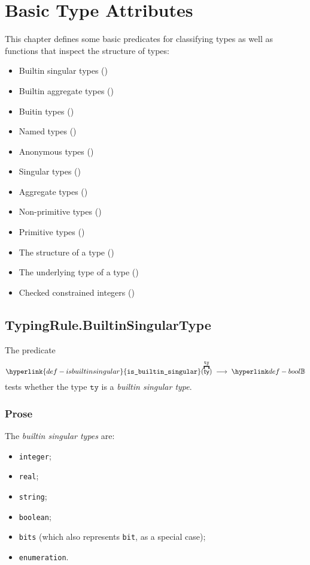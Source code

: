 \documentclass{book}
\newcommand\isbuiltinsingular[0]{\hyperlink{def-isbuiltinsingular}{\texttt{is\_builtin\_singular}}}
\newcommand\tty[0]{\texttt{ty}}
\begin{document}
\chapter{Basic Type Attributes}

This chapter defines some basic predicates for classifying types as well as
functions that inspect the structure of types:
\begin{itemize}
  \item Builtin singular types ()
  \item Builtin aggregate types ()
  \item Buitin types ()
  \item Named types ()
  \item Anonymous types ()
  \item Singular types ()
  \item Aggregate types ()
  \item Non-primitive types ()
  \item Primitive types ()
  \item The structure of a type ()
  \item The underlying type of a type ()
  \item Checked constrained integers ()
\end{itemize}

\section{TypingRule.BuiltinSingularType \label{sec:TypingRule.BuiltinSingularType}}
\hypertarget{def-isbuiltinsingular}{}
The predicate
\[
  \isbuiltinsingular(\overname{\ty}{\tty}) \;\aslto\; \Bool
\]
tests whether the type $\tty$ is a \emph{builtin singular type}.

\subsection{Prose}
The \emph{builtin singular types} are:
\begin{itemize}
\item \texttt{integer};
\item \texttt{real};
\item \texttt{string};
\item \texttt{boolean};
\item \texttt{bits} (which also represents \texttt{bit}, as a special case);
\item \texttt{enumeration}.
\end{itemize}
\end{document}
